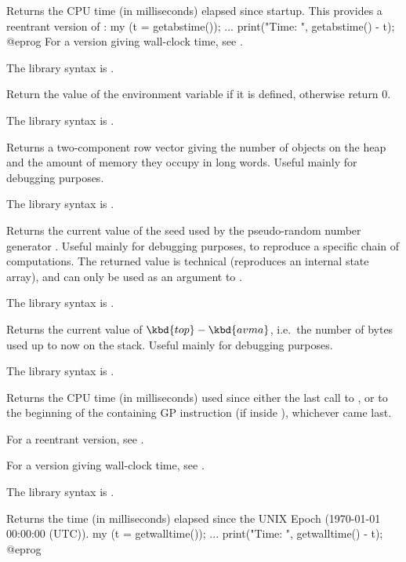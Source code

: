 \label{se:getabstime}
Returns the CPU time (in milliseconds) elapsed since  startup.
This provides a reentrant version of :
\bprog
my (t = getabstime());
...
print("Time: ", getabstime() - t);
@eprog
For a version giving wall-clock time, see .

The library syntax is .

\label{se:getenv}
Return the value of the environment variable  if it is defined, otherwise return 0.

The library syntax is .

\label{se:getheap}
Returns a two-component row vector giving the
number of objects on the heap and the amount of memory they occupy in long
words. Useful mainly for debugging purposes.

The library syntax is .

\label{se:getrand}
Returns the current value of the seed used by the
pseudo-random number generator . Useful mainly for debugging
purposes, to reproduce a specific chain of computations. The returned value
is technical (reproduces an internal state array), and can only be used as an
argument to .

The library syntax is .

\label{se:getstack}
Returns the current value of $\kbd{top}-\kbd{avma}$, i.e.~the number of
bytes used up to now on the stack. Useful mainly for debugging purposes.

The library syntax is .

\label{se:gettime}
Returns the CPU time (in milliseconds) used since either the last call to
, or to the beginning of the containing GP instruction (if
inside ), whichever came last.

For a reentrant version, see .

For a version giving wall-clock time, see .

The library syntax is .

\label{se:getwalltime}
Returns the time (in milliseconds) elapsed since the UNIX Epoch
(1970-01-01 00:00:00 (UTC)).
\bprog
my (t = getwalltime());
...
print("Time: ", getwalltime() - t);
@eprog

